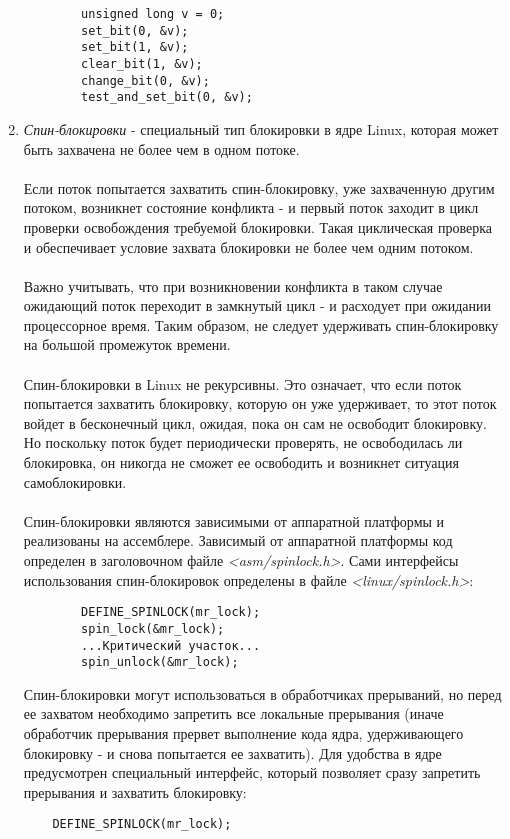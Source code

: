 \begin{enumerate}
\begin{lstlisting}
        unsigned long v = 0;
        set_bit(0, &v);
        set_bit(1, &v);
        clear_bit(1, &v);
        change_bit(0, &v);
        test_and_set_bit(0, &v);
    \end{lstlisting}
    \item \textit{Спин-блокировки} - специальный тип блокировки в ядре Linux, которая может быть захвачена не более чем в одном потоке.
    \\\\
    Если поток попытается захватить спин-блокировку, уже захваченную другим потоком, возникнет состояние конфликта - и первый поток заходит в цикл проверки освобождения требуемой блокировки. Такая циклическая проверка и обеспечивает условие захвата блокировки не более чем одним потоком. 
    \\\\ Важно учитывать, что при возникновении конфликта в таком случае ожидающий поток переходит в замкнутый цикл - и расходует при ожидании процессорное время. Таким образом, не следует удерживать спин-блокировку на большой промежуток времени.
    \\\\
    Спин-блокировки в Linux не рекурсивны. Это означает, что если поток попытается захватить блокировку, которую он уже удерживает, то этот поток войдет в бесконечный цикл, ожидая, пока он сам не освободит блокировку. Но поскольку поток будет периодически проверять, не освободилась ли блокировка, он никогда не сможет ее освободить и возникнет ситуация самоблокировки.
    \\\\
    Спин-блокировки являются зависимыми от аппаратной платформы и реализованы на ассемблере. Зависимый от аппаратной платформы код определен в заголовочном файле \textit{<asm/spinlock.h>}. Сами интерфейсы использования спин-блокировок определены в файле \textit{<linux/spinlock.h>}:
    
    \begin{lstlisting}
        DEFINE_SPINLOCK(mr_lock);
        spin_lock(&mr_lock);
        ...Критический участок...
        spin_unlock(&mr_lock);
    \end{lstlisting}
    Спин-блокировки могут использоваться в обработчиках прерываний, но перед ее захватом необходимо запретить все локальные прерывания (иначе обработчик прерывания прервет выполнение кода ядра, удерживающего блокировку - и снова попытается ее захватить). Для удобства в ядре предусмотрен специальный интерфейс, который позволяет сразу запретить прерывания и захватить блокировку:
    \begin{lstlisting}
    DEFINE_SPINLOCK(mr_lock);
    

\end{lstlisting}
\end{enumerate}

